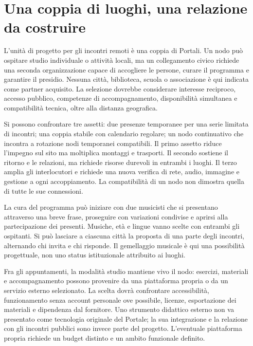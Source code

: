 \section{Una coppia di luoghi, una relazione da costruire}
L'unità di progetto per gli incontri remoti è una coppia di Portali.
Un nodo può ospitare studio individuale o attività locali, ma un collegamento
civico richiede una seconda organizzazione capace di accogliere le persone,
curare il programma e garantire il presidio. Nessuna città, biblioteca,
scuola o associazione è qui indicata come partner acquisito.
La selezione dovrebbe considerare interesse reciproco, accesso pubblico,
competenze di accompagnamento, disponibilità simultanea e compatibilità
tecnica, oltre alla distanza geografica.

Si possono confrontare tre assetti: due presenze temporanee per una serie
limitata di incontri; una coppia stabile con calendario regolare; un nodo
continuativo che incontra a rotazione nodi temporanei compatibili.
Il primo assetto riduce l'impegno sul sito ma moltiplica montaggi e trasporti.
Il secondo sostiene il ritorno e le relazioni, ma richiede risorse durevoli
in entrambi i luoghi. Il terzo amplia gli interlocutori e richiede una nuova
verifica di rete, audio, immagine e gestione a ogni accoppiamento.
La compatibilità di un nodo non dimostra quella di tutte le sue connessioni.

La cura del programma può iniziare con due musicisti che si presentano
attraverso una breve frase, proseguire con variazioni condivise e aprirsi
alla partecipazione dei presenti. Musiche, età e lingue vanno scelte con
entrambi gli ospitanti. Si può lasciare a ciascuna città la proposta di una
parte degli incontri, alternando chi invita e chi risponde. Il gemellaggio
musicale è qui una possibilità progettuale, non uno status istituzionale
attribuito ai luoghi.

Fra gli appuntamenti, la modalità studio mantiene vivo il nodo: esercizi,
materiali e accompagnamento possono provenire da una piattaforma propria
o da un servizio esterno selezionato. La scelta dovrà confrontare
accessibilità, funzionamento senza account personale ove possibile,
licenze, esportazione dei materiali e dipendenza dal fornitore. Uno
strumento didattico esterno non va presentato come tecnologia originale
del Portale; la sua integrazione e la relazione con gli incontri pubblici
sono invece parte del progetto. L'eventuale piattaforma propria richiede
un budget distinto e un ambito funzionale definito.

